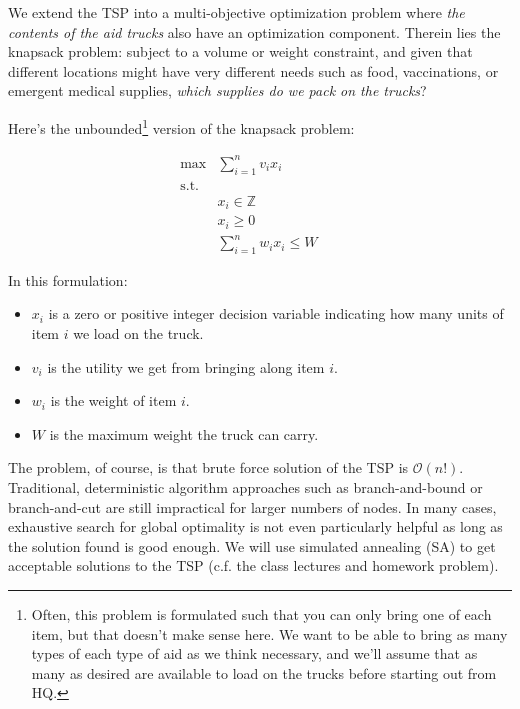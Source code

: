 \documentclass{article} %
\begin{document}
We extend the TSP into a multi-objective optimization problem
where \emph{the contents of the aid trucks} also have an optimization component. Therein lies
the knapsack problem: subject to a volume or weight constraint, and given that different locations
might have very different needs such as food, vaccinations, or emergent medical supplies, \emph{which
supplies do we pack on the trucks}?

Here's the unbounded\footnote{Often, this problem is formulated such that you can only bring one of
each item, but that doesn't make sense here. We want to be able to bring as many types of each type
of aid as we think necessary, and we'll assume that as many as desired are available to load on the
trucks before starting out from HQ.} version of the knapsack problem:

\begin{align*}
\max &\sum_{i=1}^n v_i x_i &&  \\
\mathrm{s.t.} & \\
    & x_i \in \mathbb{Z} \\
    & x_i \geq 0 \\
	& \sum_{i=1}^n w_ix_i \leq W
\end{align*}

In this formulation:

\begin{itemize}
  \item $x_{i}$ is a zero or positive integer decision variable indicating how many units of item $i$
        we load on the truck.
  \item $v_i$ is the utility we get from bringing along item $i$.
  \item $w_i$ is the weight of item $i$.
  \item $W$ is the maximum weight the truck can carry.
\end{itemize}

The problem, of course, is that brute force solution of the TSP is $\mathcal{O}$$(n!)$. Traditional, deterministic
algorithm approaches such as branch-and-bound or branch-and-cut are still impractical for larger numbers of nodes.
In many cases, exhaustive search for global optimality is not even particularly helpful as long as the solution
found is good enough. We will use simulated annealing (SA) to get acceptable solutions to the TSP (c.f. the class lectures
and homework problem).
\end{document}
